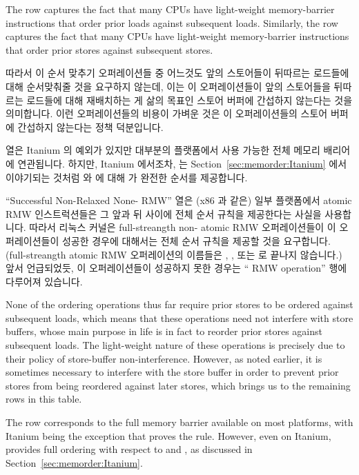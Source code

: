 {	The  row captures the fact that many CPUs have
	light-weight memory-barrier instructions that order prior loads against
	subsequent loads.
	Similarly,
	the  row captures the fact that many CPUs have
	light-weight memory-barrier instructions that order prior stores against
	subsequent stores.
	\fi

	따라서 이 순서 맞추기 오퍼레이션들 중 어느것도 앞의 스토어들이 뒤따르는
	로드들에 대해 순서맞춰줄 것을 요구하지 않는데, 이는 이 오퍼레이션들이
	앞의 스토어들을 뒤따르는 로드들에 대해 재배치하는 게 삶의 목표인 스토어
	버퍼에 간섭하지 않는다는 것을 의미합니다.
	이런 오퍼레이션들의 비용이 가벼운 것은 이 오퍼레이션들의 스토어 버퍼에
	간섭하지 않는다는 정책 덕분입니다.

	 열은 Itanium 의 예외가 있지만 대부분의 플랫폼에서 사용
	가능한 전체 메모리 배리어에 연관됩니다.
	하지만, Itanium 에서조차,  는
	Section~\ref{sec:memorder:Itanium} 에서 이야기되는 것처럼
	 와  에 대해  가 완전한
	순서를 제공합니다.

	``Successful Non-Relaxed None- RMW'' 열은 (x86 과 같은) 일부
	플랫폼에서 atomic RMW 인스트럭션들은 그 앞과 뒤 사이에 전체 순서 규칙을
	제공한다는 사실을 사용합니다.
	따라서 리눅스 커널은 full-streangth non- atomic RMW 오퍼레이션들이 이
	오퍼레이션들이 성공한 경우에 대해서는 전체 순서 규칙을 제공할 것을
	요구합니다.
	(full-streangth atomic RMW 오퍼레이션의 이름들은 ,
	, 또는  로 끝나지 않습니다.)
	앞서 언급되었듯, 이 오퍼레이션들이 성공하지 못한 경우는
	`` RMW operation'' 행에 다루어져 있습니다.
	\iffalse

	None of the ordering operations thus far require prior stores to be
	ordered against subsequent loads, which means that these operations
	need not interfere with store buffers, whose main purpose in life
	is in fact to reorder prior stores against subsequent loads.
	The light-weight nature of these operations is precisely due to
	their policy of store-buffer non-interference.
	However, as noted earlier, it is sometimes necessary to interfere
	with the store buffer in order to prevent prior stores from being
	reordered against later stores, which brings us to the remaining
	rows in this table.

	The  row corresponds to the full memory barrier
	available on most platforms, with Itanium being the exception
	that proves the rule.
	However, even on Itanium,  provides full ordering
	with respect to  and ,
	as discussed in Section~\ref{sec:memorder:Itanium}.

}
